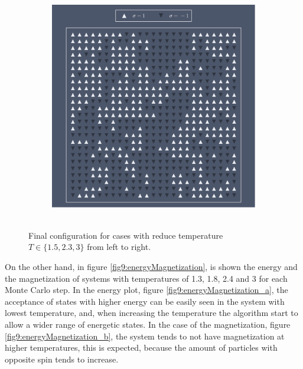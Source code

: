 \documentclass[main.tex]{subfiles}
\begin{document}
\begin{figure}[ht!]
\begin{subfigure}[c]{0.3\textwidth}
        \caption{~}\label{fig9:finalStates_b}
    \end{subfigure}\begin{subfigure}[c]{0.3\textwidth}
        \includegraphics[width=\textwidth]{imgs/hw7/system_T3.pdf}
        \caption{~}\label{fig9:finalStates_c}
    \end{subfigure}
    
    \caption{Final configuration for cases with reduce temperature $T\in\{1.5,2.3,3\}$ from left to right.}
    \label{fig9:finalStates}
\end{figure}

On the other hand, in figure \ref{fig9:energyMagnetization}, is shown the energy and the magnetization of systems with temperatures of 1.3, 1.8, 2.4 and 3 for each Monte Carlo step.
In the energy plot, figure \ref{fig9:energyMagnetization_a}, the acceptance of states with higher energy can be easily seen in the system with lowest temperature, and, when increasing the temperature the algorithm start to allow a wider range of energetic states.
In the case of the magnetization, figure \ref{fig9:energyMagnetization_b}, the system tends to not have magnetization at higher temperatures, this is expected, because the amount of particles with opposite spin tends to increase.
\end{document}
